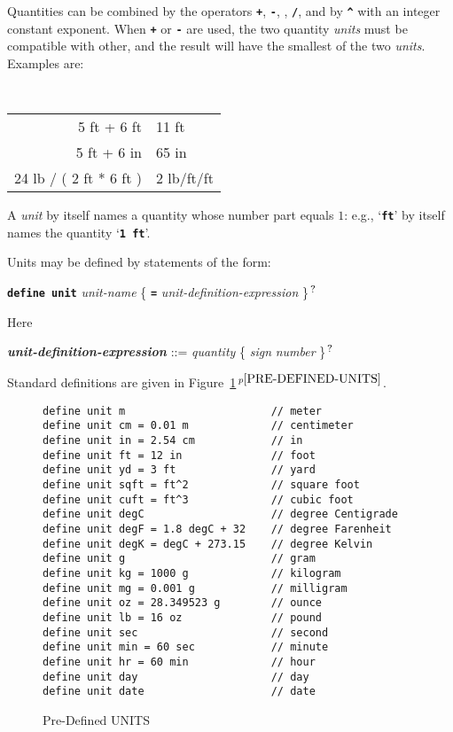 \documentclass[12pt]{article}
\newcommand{\TT}[1]{{\tt \bfseries #1}}
\newcommand{\emkey}[1]{{\em \bfseries #1}}
\newcommand{\itemref}[1]{\ref{#1}$\,^{p\pageref{#1}}$}
\newcommand{\QMARK}{{$^{\,\mbox{\footnotesize ?}}$}}
\newcommand{\CIRCUM}{\textasciicircum}
\newlength{\figurewidth}
\newenvironment{boxedfigure}[1][!btp]%
	{\begin{figure*}[#1]
	 \begin{lrbox}{\figurebox}
	 \begin{minipage}{\figurewidth}

	 \vspace*{1ex}}%
	{
	 \vspace*{1ex}

	 \end{minipage}
	 \end{lrbox}
	 \begin{center}
	 \fbox{\hspace*{0.1in}\usebox{\figurebox}\hspace*{0.1in}}
	 \end{center}
	 \end{figure*}}
\newenvironment{indpar}[1][0.3in]%
	{\begin{list}{}%
		     {\setlength{\itemsep}{0in}%
		      \setlength{\topsep}{0in}%
		      \setlength{\parsep}{1ex}%
		      \setlength{\labelwidth}{#1}%
		      \setlength{\leftmargin}{#1}%
		      \addtolength{\leftmargin}{\labelsep}}%
	 \item}%
	{\end{list}}
\begin{document}
Quantities can be combined by the operators \TT{+}, \TT{-},
\TT{*}, \TT{/}, and by \TT{\CIRCUM} with an integer constant exponent.
When \TT{+} or \TT{-} are used, the two quantity {\em units} must be
compatible with other, and the result will have the smallest
of the two {\em units}.  Examples are:
\begin{center}
\tt
\begin{tabular}{r@{~$\Longrightarrow$~}l}
5 ft + 6 ft & 11 ft \\
5 ft + 6 in & 65 in \\
24 lb / ( 2 ft * 6 ft ) & 2 lb/ft/ft \\
\end{tabular}
\end{center}

A {\em unit} by itself names a quantity whose number part equals $1$:
e.g., `\TT{ft}' by itself names the quantity `\TT{1 ft}'.

Units may be defined by statements of the form:
\begin{center}
\TT{define unit} {\em unit-name}
    \{ \TT{=} {\em unit-definition-expression} \}\QMARK{}
\end{center}

Here
\begin{indpar}
\emkey{unit-definition-expression} ::= {\em quantity}
    \{ {\em sign} {\em number} \}\QMARK{}
\end{indpar}

Standard definitions are given in Figure~\itemref{PRE-DEFINED-UNITS}.

\begin{boxedfigure}[t]
\begin{indpar}\begin{verbatim}
define unit m                       // meter
define unit cm = 0.01 m             // centimeter
define unit in = 2.54 cm            // in
define unit ft = 12 in              // foot
define unit yd = 3 ft               // yard
define unit sqft = ft^2             // square foot
define unit cuft = ft^3             // cubic foot
define unit degC                    // degree Centigrade
define unit degF = 1.8 degC + 32    // degree Farenheit
define unit degK = degC + 273.15    // degree Kelvin
define unit g                       // gram
define unit kg = 1000 g             // kilogram
define unit mg = 0.001 g            // milligram
define unit oz = 28.349523 g        // ounce
define unit lb = 16 oz              // pound
define unit sec                     // second
define unit min = 60 sec            // minute
define unit hr = 60 min             // hour
define unit day                     // day
define unit date                    // date
\end{verbatim}\end{indpar}

\caption{Pre-Defined UNITS}
\label{PRE-DEFINED-UNITS}
\end{boxedfigure}
\end{document}
